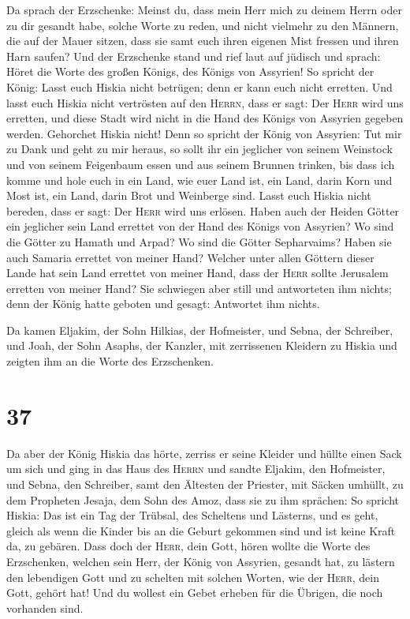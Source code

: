  Da sprach der Erzschenke: Meinst du, dass mein Herr mich
zu deinem Herrn oder zu dir gesandt habe, solche Worte zu reden, und
nicht vielmehr zu den Männern, die auf der Mauer sitzen, dass sie samt
euch ihren eigenen Mist fressen und ihren Harn saufen? 
Und der Erzschenke stand und rief laut auf jüdisch und sprach: Höret die
Worte des großen Königs, des Königs von Assyrien!  So
spricht der König: Lasst euch Hiskia nicht betrügen; denn er kann euch
nicht erretten.  Und lasst euch Hiskia nicht vertrösten
auf den \textsc{Herrn}, dass er sagt: Der \textsc{Herr} wird uns
erretten, und diese Stadt wird nicht in die Hand des Königs von Assyrien
gegeben werden.  Gehorchet Hiskia nicht! Denn so spricht
der König von Assyrien: Tut mir zu Dank und geht zu mir heraus, so sollt
ihr ein jeglicher von seinem Weinstock und von seinem Feigenbaum essen
und aus seinem Brunnen trinken,  bis dass ich komme und
hole euch in ein Land, wie euer Land ist, ein Land, darin Korn und Most
ist, ein Land, darin Brot und Weinberge sind.  Lasst euch
Hiskia nicht bereden, dass er sagt: Der \textsc{Herr} wird uns erlösen.
Haben auch der Heiden Götter ein jeglicher sein Land errettet von der
Hand des Königs von Assyrien?  Wo sind die Götter zu
Hamath und Arpad? Wo sind die Götter Sepharvaims? Haben sie auch Samaria
errettet von meiner Hand?  Welcher unter allen Göttern
dieser Lande hat sein Land errettet von meiner Hand, dass der
\textsc{Herr} sollte Jerusalem erretten von meiner Hand? 
Sie schwiegen aber still und antworteten ihm nichts; denn der König
hatte geboten und gesagt: Antwortet ihm nichts.

 Da kamen Eljakim, der Sohn Hilkias, der Hofmeister, und
Sebna, der Schreiber, und Joah, der Sohn Asaphs, der Kanzler, mit
zerrissenen Kleidern zu Hiskia und zeigten ihm an die Worte des
Erzschenken.

\hypertarget{section-36}{%
\section{37}\label{section-36}}

 Da aber der König Hiskia das hörte, zerriss er seine
Kleider und hüllte einen Sack um sich und ging in das Haus des
\textsc{Herrn}  und sandte Eljakim, den Hofmeister, und
Sebna, den Schreiber, samt den Ältesten der Priester, mit Säcken
umhüllt, zu dem Propheten Jesaja, dem Sohn des Amoz,  dass
sie zu ihm sprächen: So spricht Hiskia: Das ist ein Tag der Trübsal, des
Scheltens und Lästerns, und es geht, gleich als wenn die Kinder bis an
die Geburt gekommen sind und ist keine Kraft da, zu gebären.
 Dass doch der \textsc{Herr}, dein Gott, hören wollte die
Worte des Erzschenken, welchen sein Herr, der König von Assyrien,
gesandt hat, zu lästern den lebendigen Gott und zu schelten mit solchen
Worten, wie der \textsc{Herr}, dein Gott, gehört hat! Und du wollest ein
Gebet erheben für die Übrigen, die noch vorhanden sind.

